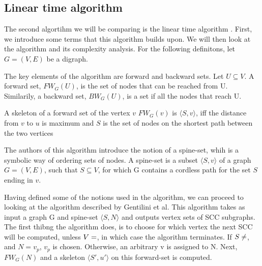 \documentclass[../master.tex]{subfiles}
\newcommand{\FW}[2][G]{\ensuremath{FW_{#1}(#2)}}
\newcommand{\BW}[2][G]{\ensuremath{BW_{#1}(#2)}}
\newcommand{\pair}[2]{\ensuremath{\langle #1, #2\rangle}}
\begin{document}
\subsection{Linear time algorithm}
The second algortihm we will be comparing is the linear time algorithm \cite{linear}. First, we introduce some terms that this algorithm builds upon. We will then look at the algorithm and its complexity analysis. For the following definitons, let $G=(V,E)$ be a digraph.

The key elements of the algorithm are forward and backward sets. Let $U\subseteq V$. A forward set, \FW{U}, is the set of nodes that can be reached from U. Similarily, a backward set, \BW{U}, is a set if all the nodes that reach U.

A skeleton of a forward set of the vertex $v$ \FW{v} is $\langle S, v \rangle$, iff the distance from $v$ to $u$ is maximum and $S$ is the set of nodes on the shortest path between the two vertices

The authors of this algorithm introduce the notion of a spine-set, whih is a symbolic way of ordering sets of nodes. A spine-set is a subset $\langle S, v\rangle$ of a graph $G=(V,E)$, such that $S\subseteq V$, for which G contains a cordless path for the set $S$ ending in $v$.

Having defined some of the notions used in the algorithm, we can proceed to looking at the algorithm described by Gentilini et al. This algorithm takes as input a graph G and spine-set $\langle S, N\rangle$ and outputs vertex sets of SCC subgraphs.
The first thibng the algorithm does, is to choose for which vertex the next SCC will be computed, unless $V=\empty$, in which case the algorithm terminates. If $S\neq\empty$, and $N={v_p}$, $v_p$ is chosen. Otherwise, an arbitrary v is assigned to N. Next, \FW{N} and a skeleton \pair{S'}{u'} on this forward-set is computed.

\todo[inline]{is preimage the same as pre here?]}
\end{document}
